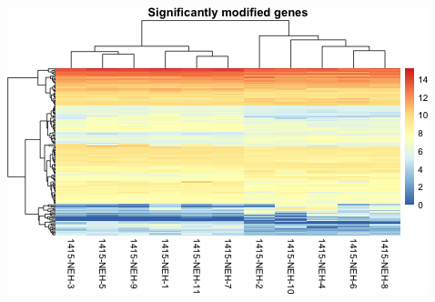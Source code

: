 \documentclass[]{article}
\begin{document}
\includegraphics{figures-noura/heatmap-3.png}
\end{document}
